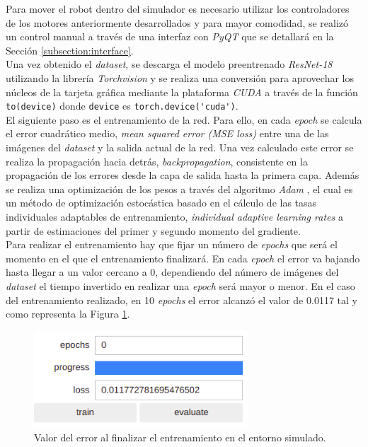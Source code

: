 Para mover el robot dentro del simulador es necesario utilizar los controladores de los motores anteriormente desarrollados y para mayor comodidad, se realizó un control manual a través de una interfaz con \textit{PyQT} que se detallará en la Sección \ref{subsection:interface}.\\

Una vez obtenido el \textit{dataset}, se descarga el modelo preentrenado \textit{ResNet-18} utilizando la librería \textit{Torchvision} y se realiza una conversión para aprovechar los núcleos de la tarjeta gráfica mediante la plataforma \textit{CUDA} a través de la función \verb|to(device)| donde \verb|device| es \verb|torch.device('cuda')|.\\

El siguiente paso es el entrenamiento de la red. Para ello, en cada \textit{epoch} se calcula el error cuadrático medio, \textit{mean squared error (MSE loss)} entre una de las imágenes del \textit{dataset} y la salida actual de la red. Una vez calculado este error se realiza la propagación hacia detrás, \textit{backpropagation}, consistente en la propagación de los errores desde la capa de salida hasta la primera capa. Además se realiza una optimización de los pesos a través del algoritmo \textit{Adam} \cite{adam}, el cual es un método de optimización estocástica basado en el cálculo de las tasas individuales adaptables de entrenamiento, \textit{individual adaptive learning rates} a partir de estimaciones del primer y segundo momento del gradiente.\\

Para realizar el entrenamiento hay que fijar un número de \textit{epochs} que será el momento en el que el entrenamiento finalizará. En cada \textit{epoch} el error va bajando hasta llegar a un valor cercano a 0, dependiendo del número de imágenes del \textit{dataset} el tiempo invertido en realizar una \textit{epoch} será mayor o menor. En el caso del entrenamiento realizado, en 10 \textit{epochs} el error alcanzó el valor de 0.0117 tal y como representa la Figura \ref{fig:epochsimulator}.\\

\begin{figure} [h!]
	\begin{center}
		\includegraphics[width=8cm]{figs/epochSimulator}
	\end{center}
	\caption{Valor del error al finalizar el entrenamiento en el entorno simulado.}
	\label{fig:epochsimulator}
\end{figure}\

